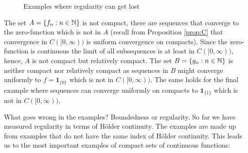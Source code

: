 \begin{example}
\begin{enumerate}[label=(\roman*)]
\begin{figure}[h]
\begin{center}
				\caption*{Examples where regularity can get lost}
			\end{center}
		\end{figure}
		The set $A=\{f_n:n\in\mathbb{N}\}$ is not compact, there are sequences that converge to the zero-function which is not in $A$ (recall from Proposition \ref{prop:C} that convergence in $C([0,\infty))$ is uniform convergence on compacts). Since the zero-function is continuous the limit of all subsequences is at least in $C([0,\infty))$, hence, $A$ is not compact but  relatively compact. The set $B=\{g_n:n\in\mathbb{N}\}$ is neither compact nor relatively compact as sequences in $B$ might converge uniformly to $f=\mathbf 1_{\{0\}}$ which is not in $C([0,\infty))$. The same holds for the final example where sequences can converge uniformly on compacts to $\mathbf 1_{\{1\}}$ which is not in $C([0,\infty))$.
	\end{enumerate}
\end{example}
What goes wrong in the examples? Boundedness or regularity. So far we have measured regularity in terms of H\"older continuity. The examples are made up from examples that do not have the same index of H\"older continuity. This leads us to the most important examples of compact sets of continuous functions:

